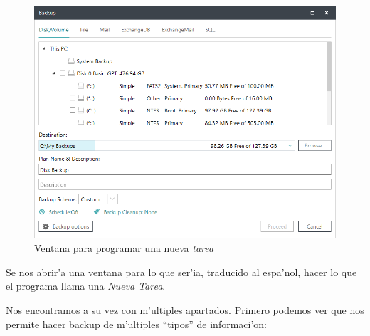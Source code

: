 \documentclass[11pt]{article}
\begin{document}
		\begin{figure}[H]
			\centering
			\includegraphics[width=.8\textwidth]{Images/easeus/use_newtask}
			\caption{Ventana para programar una nueva \textit{tarea}}
		\end{figure}
	
		Se nos abrir'a una ventana para lo que ser'ia, traducido al espa'nol, hacer lo que el programa llama una \textit{Nueva Tarea}.
		
		Nos encontramos a su vez con m'ultiples apartados. Primero podemos ver que nos permite hacer backup de m'ultiples ``tipos'' de informaci'on:
		
\end{document}
